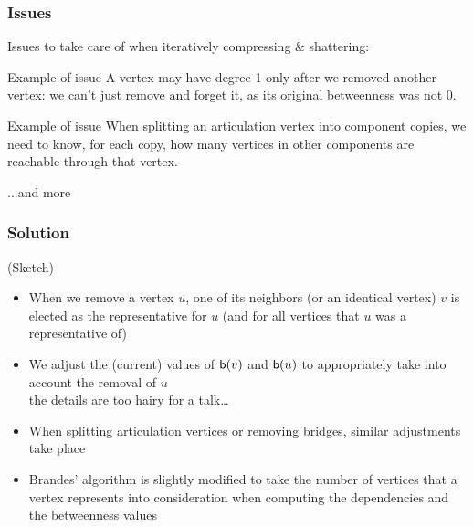 \begin{frame}
  \frametitle{Issues}
  Issues to take care of when iteratively compressing \& shattering:
  \begin{block}{Example of issue}
    A vertex may have degree 1 only after we removed another vertex: we can't
    just remove and forget it, as its original betweenness was not 0.
  \end{block}
  \pause
  \begin{block}{Example of issue}
    When splitting an articulation vertex into component copies, we need to know,
    for each copy, how many vertices in other components are reachable through
    that vertex.
  \end{block}
  ...and more
\end{frame}

\begin{frame}
  \frametitle{Solution}
  (Sketch)
  \begin{itemize}
    \item When we remove a vertex $u$, one of its neighbors (or an identical vertex)
      $v$ is elected as the representative for $u$ (and for all vertices that $u$
      was a representative of)
    \item We adjust the (current) values of $\mathsf{b}(v)$ and $\mathsf{b}(u)$ to
      appropriately take into account the removal of $u$\\
      \qquad the details are too hairy for a talk\ldots
    \item When splitting articulation vertices or removing bridges, similar
      adjustments take place
    \item Brandes' algorithm is slightly modified to take the number of vertices
      that a vertex represents into consideration when computing the
      dependencies and the betweenness values
  \end{itemize}
\end{frame}

